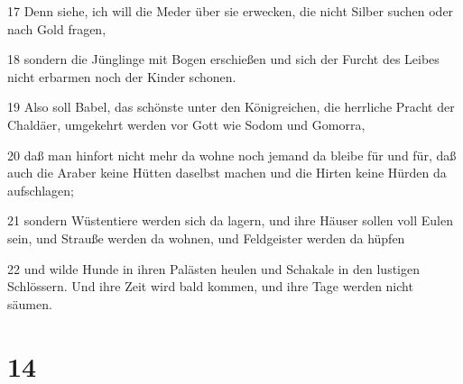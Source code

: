 \par 17 Denn siehe, ich will die Meder über sie erwecken, die nicht Silber suchen oder nach Gold fragen,
\par 18 sondern die Jünglinge mit Bogen erschießen und sich der Furcht des Leibes nicht erbarmen noch der Kinder schonen.
\par 19 Also soll Babel, das schönste unter den Königreichen, die herrliche Pracht der Chaldäer, umgekehrt werden vor Gott wie Sodom und Gomorra,
\par 20 daß man hinfort nicht mehr da wohne noch jemand da bleibe für und für, daß auch die Araber keine Hütten daselbst machen und die Hirten keine Hürden da aufschlagen;
\par 21 sondern Wüstentiere werden sich da lagern, und ihre Häuser sollen voll Eulen sein, und Strauße werden da wohnen, und Feldgeister werden da hüpfen
\par 22 und wilde Hunde in ihren Palästen heulen und Schakale in den lustigen Schlössern. Und ihre Zeit wird bald kommen, und ihre Tage werden nicht säumen.

\chapter{14}

